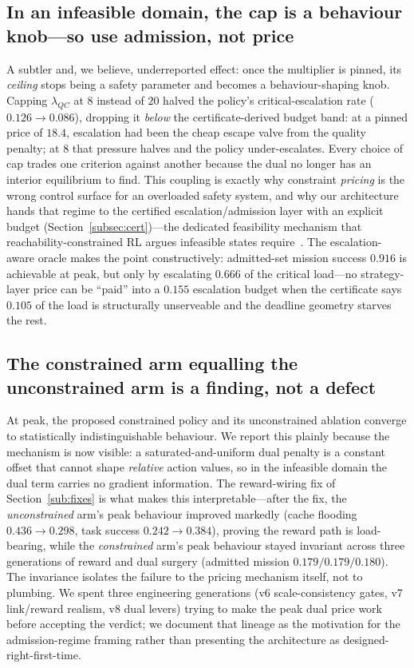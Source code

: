\subsection{In an infeasible domain, the cap is a behaviour knob---so use
admission, not price}
A subtler and, we believe, underreported effect: once the multiplier is
pinned, its \emph{ceiling} stops being a safety parameter and becomes a
behaviour-shaping knob. Capping $\lambda_{QC}$ at $8$ instead of $20$
halved the policy's critical-escalation rate ($0.126\to0.086$), dropping
it \emph{below} the certificate-derived budget band: at a pinned price of
$18.4$, escalation had been the cheap escape valve from the quality
penalty; at $8$ that pressure halves and the policy under-escalates.
Every choice of cap trades one criterion against another because the dual
no longer has an interior equilibrium to find. This coupling is exactly
why constraint \emph{pricing} is the wrong control surface for an
overloaded safety system, and why our architecture hands that regime to
the certified escalation/admission layer with an explicit budget
(Section~\ref{subsec:cert})---the dedicated feasibility mechanism that
reachability-constrained RL argues infeasible states
require~\cite{yu2022reachability}. The escalation-aware oracle makes the
point constructively: admitted-set mission success $0.916$ is achievable
at peak, but only by escalating $0.666$ of the critical load---no
strategy-layer price can be ``paid'' into a $0.155$ escalation budget when
the certificate says $0.105$ of the load is structurally unserveable and
the deadline geometry starves the rest.

\subsection{The constrained arm equalling the unconstrained arm is a
finding, not a defect}
At peak, the proposed constrained policy and its unconstrained ablation
converge to statistically indistinguishable behaviour. We report this
plainly because the mechanism is now visible: a saturated-and-uniform dual
penalty is a constant offset that cannot shape \emph{relative} action
values, so in the infeasible domain the dual term carries no gradient
information. The reward-wiring fix of Section~\ref{sub:fixes} is what
makes this interpretable---after the fix, the \emph{unconstrained} arm's
peak behaviour improved markedly (cache flooding $0.436\to0.298$, task
success $0.242\to0.384$), proving the reward path is load-bearing, while
the \emph{constrained} arm's peak behaviour stayed invariant across three
generations of reward and dual surgery (admitted mission
$0.179/0.179/0.180$). The invariance isolates the failure to the pricing
mechanism itself, not to plumbing. We spent three engineering generations
(v6 scale-consistency gates, v7 link/reward realism, v8 dual levers)
trying to make the peak dual price work before accepting the verdict; we
document that lineage as the motivation for the admission-regime framing
rather than presenting the architecture as designed-right-first-time.

